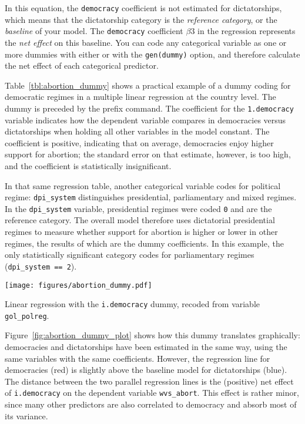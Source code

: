 	In this equation, the \texttt{democracy} coefficient is not estimated for dictatorships, which means that the dictatorship category is the \emph{reference category}, or the \emph{baseline} of your model. The \texttt{democracy} coefficient $\beta 3$ in the regression represents the \emph{net effect} on this baseline. You can code any categorical variable as one or more dummies with either  or  with the \texttt{gen(dummy)} option, and therefore calculate the net effect of each categorical predictor.

	Table~\ref{tbl:abortion_dummy} shows a practical example of a dummy coding for democratic regimes in a multiple linear regression at the country level. The dummy is preceded by the  prefix command. The coefficient for the \texttt{1.democracy} variable indicates how the dependent variable compares in democracies versus dictatorships when holding all other variables in the model constant. The coefficient is positive, indicating that on average, democracies enjoy higher support for abortion; the standard error on that estimate, however, is too high, and the coefficient is statistically insignificant.

	In that same regression table, another categorical variable codes for political regime: \texttt{dpi\_system} distinguishes presidential, parliamentary and mixed regimes. In the \texttt{dpi\_system} variable, presidential regimes were coded \texttt{0} and are the reference category. The overall model therefore uses dictatorial presidential regimes to measure whether support for abortion is higher or lower in other regimes, the results of which are the dummy coefficients. In this example, the only statistically significant category codes for parliamentary regimes (\texttt{dpi\_system~==~2}).

	\begin{table}[htp]
		\texttt{[image: figures/abortion\_dummy.pdf]}

	  	\caption[Linear regression with a dummy]{\label{tbl:abortion_dummy}
		Linear regression with the \texttt{i.democracy} dummy, recoded from variable \texttt{gol\_polreg}.\\
		}
	\end{table}%
	
	Figure~\ref{fig:abortion_dummy_plot} shows how this dummy translates graphically: democracies and dictatorships have been estimated in the same way, using the same variables with the same coefficients. However, the regression line for democracies (red) is slightly above the baseline model for dictatorships (blue). The distance between the two parallel regression lines is the (positive) net effect of \texttt{i.democracy} on the dependent variable \texttt{wvs\_abort}. This effect is rather minor, since many other predictors are also correlated to democracy and absorb most of its variance.

